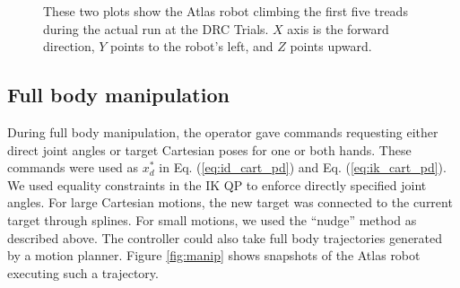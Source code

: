 \documentclass{ws-ijhr}
\newcommand{\eref}[1] {Eq. (\ref{#1})}
\newcommand{\fref}[1] {Figure \ref{#1}}
\begin{document}
\begin{figure}
  \begin{center}
    \caption{
      These two plots show the Atlas robot climbing the first five treads during
      the actual run at the DRC Trials. 
      $X$ axis is the forward direction, $Y$ points to the robot's left, and
      $Z$ points upward. 
      }\label{fig:ladder_data} 
  \end{center}
\end{figure}

\subsection{Full body manipulation}
During full body manipulation, the operator gave commands requesting either 
direct joint angles or target Cartesian poses for one or both hands. 
These commands were used as $x^*_d$ in \eref{eq:id_cart_pd} and \eref{eq:ik_cart_pd}.
We used equality constraints in the IK QP to enforce directly specified joint angles. 
For large Cartesian motions, the new target was connected to the current target
through splines. 
For small motions, we used the ``nudge'' method as described above. 
The controller could also take full body trajectories generated by a motion planner.
\fref{fig:manip} shows snapshots of the Atlas robot executing such a trajectory.
\end{document}
